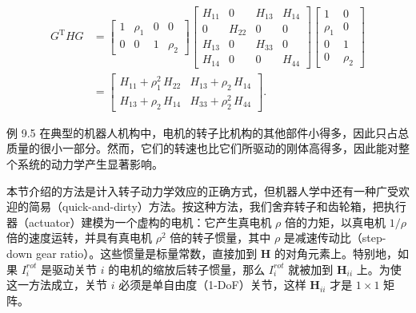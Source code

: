 \documentclass[10pt,a4paper]{book}
\theoremstyle{thmstyle} %
\theoremstyle{defstyle} %
\theoremstyle{prostyle} %
\begin{document}
$$
\begin{array}{rl} { G ^{\mathrm { T} } H G } & { = \left[ \begin{array}{llll} { 1 } & { \rho _ { 1 } } & { 0 } & { 0 } \\{ 0 } & { 0 } & { 1 } & { \rho _ { 2 } } \end{array} \right] \left[ \begin{array}{llll} { H _ { 11 } } & { 0 } & { H _ { 13 } } & { H _ { 14 } } \\{ 0 } & { H _ { 22 } } & { 0 } & { 0 } \\{ H _ { 13 } } & { 0 } & { H _ { 33 } } & { 0 } \\{ H _ { 14 } } & { 0 } & { 0 } & { H _ { 44 } } \end{array} \right] \left[ \begin{array}{llll} { 1 } & { 0 } \\{ \rho _ { 1 } } & { 0 } \\{ 0 } & { 1 } \\{ 0 } & { \rho _ { 2 } } \end{array} \right] } \\& { = \left[ \begin{array}{llll} { H _ { 11 } + \rho _ { 1 } ^{2} \, H _ { 22 } } & { H _ { 13 } + \rho _ { 2 } \, H _ { 14 } } \\{ H _ { 13 } + \rho _ { 2 } \, H _ { 14 } } & { H _ { 33 } + \rho _ { 2 } ^{2} \, H _ { 44 } } \end{array} \right] . } \end{array}
$$



例 9.5 在典型的机器人机构中，电机的转子比机构的其他部件小得多，因此只占总质量的很小一部分。然而，它们的转速也比它们所驱动的刚体高得多，因此能对整个系统的动力学产生显著影响。



本节介绍的方法是计入转子动力学效应的正确方式，但机器人学中还有一种广受欢迎的简易（quick-and-dirty）方法。按这种方法，我们舍弃转子和齿轮箱，把执行器（actuator）建模为一个虚构的电机：它产生真电机 $\rho$ 倍的力矩，以真电机 $1/\rho$ 倍的速度运转，并具有真电机 $\rho^2$ 倍的转子惯量，其中 $\rho$ 是减速传动比（step-down gear ratio）。这些惯量是标量常数，直接加到 $\mathbf{H}$ 的对角元素上。特别地，如果 $I_i^{rot}$ 是驱动关节 $i$ 的电机的缩放后转子惯量，那么 $I_i^{rot}$ 就被加到 $\mathbf{H}_{ii}$ 上。为使这一方法成立，关节 $i$ 必须是单自由度（1-DoF）关节，这样 $\mathbf{H}_{ii}$ 才是 $1 \times 1$ 矩阵。
\end{document}
